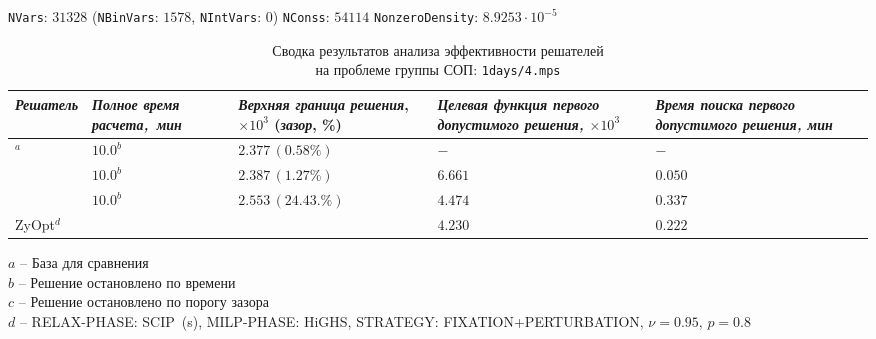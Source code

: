 \documentclass[%
	11pt,
	a4paper,
	utf8,
		]{article}
\begin{document}
\newpage

{
	\begin{table}[!h]
		\centering
		\caption{Сводка результатов анализа эффективности решателей\\ на проблеме группы СОП: \texttt{1days/4.mps}} 
		
		{\footnotesize \texttt{NVars}: $ 31328 $ (\texttt{NBinVars}: $ 1578 $,  \texttt{NIntVars}: $ 0 $) \texttt{NConss}: $ 54114 $ \texttt{NonzeroDensity}: $ 8.9253 \cdot 10^{-5} $}\\[2mm]
		
		\begin{tabular}{ p{2.9cm} | p{2.5cm} p{3.4cm} p{3.75cm} p{3.6cm} p{3.2cm} }
			\rowcolor{black!5}\emph{Решатель} & \emph{Полное время \mbox{расчета, мин}} & \emph{Верхняя граница} \mbox{\itshape решения}, $ \times 10^{3} $ (\emph{зазор}, \%) & \emph{Целевая функция первого допустимого решения, $ \times 10^3 $} & \emph{Время поиска первого допустимого решения, мин} \\
			\hline
			\rowcolor{blue!3}{CPLEX 12.8.0.0}$ ^a $ & $ 10.0^b $ & $ 2.377 \, (0.58\%) $ & $ - $ & $ - $ \\
			\rowcolor{black!5}{SCIP 8.0.3} & $ 10.0^b $ & $ 2.387 \, (1.27\%) $ & $ 6.661 $ & $ 0.050 $ \\
			\rowcolor{blue!3}{HiGHS 1.5.3} & $ 10.0^b $ & $ 2.553 \, (24.43.\%) $ & $ 4.474 $ & $ 0.337 $ \\
			\rowcolor{black!3}ZyOpt$^d $ & \ccg{$7.1 ^c \, (+29.0\%) $} & \ccb{$ 2.385 \, (0.01\%) (-2.1\%) $} & $ 4.230 $ & $ 0.222 $ \\
		\end{tabular}
	\end{table}
	\vspace*{-3mm}
	\hspace*{3mm}$ a $ -- {\footnotesize База для сравнения}\\[-7mm]
	
	\hspace*{3mm}$ b $ -- {\footnotesize Решение остановлено по времени}\\[-7mm]
	
	\hspace*{3mm}$ c $ -- {\footnotesize Решение остановлено по порогу зазора}\\[-7mm]
	
	\hspace*{3mm}$ d $ -- {\footnotesize RELAX-PHASE: SCIP~(s), MILP-PHASE: HiGHS, STRATEGY: FIXATION+PERTURBATION, $ \nu = 0.95 $, $ p = 0.8 $}\\[-7mm]
}
\end{document}
